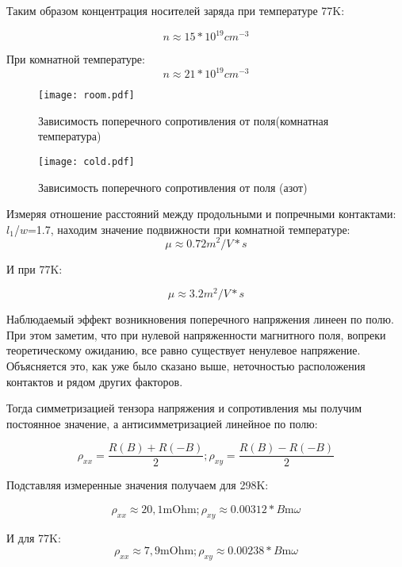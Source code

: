 Таким образом концентрация носителей заряда при температуре 77K:

$$n\approx15*10^{19}cm^{-3}$$ 

При комнатной температуре:
$$n\approx21*10^{19}cm^{-3}$$ 
\begin{figure}[H]
	\centering
	\texttt{[image: room.pdf]}
	\caption{Зависимость поперечного сопротивления от поля(комнатная температура)}
	\label{fig:room}
\end{figure}

\begin{figure}[H]
	\centering
	\texttt{[image: cold.pdf]}
	\caption{Зависимость поперечного  сопротивления от поля (азот)}
	\label{fig:cold}
\end{figure}

Измеряя отношение расстояний между продольными и попречными контактами: $l_1$/$w$=1.7, находим значение подвижности при комнатной температуре:
$$\mu\approx 0.72   m^2/V*s$$

И при 77K:

$$\mu\approx 3.2   m^2/V*s$$

Наблюдаемый эффект возникновения поперечного напряжения линеен по полю. При этом заметим, что при нулевой напряженности магнитного поля, вопреки теоретическому ожиданию, все равно существует ненулевое напряжение. Объясняется это, как уже было сказано выше, неточностью расположения контактов и рядом других факторов. 

Тогда симметризацией тензора напряжения и сопротивления мы получим постоянное значение, а антисимметризацией линейное по полю:

$$ \rho_{xx}=\frac{R(B)+R(-B)}{2};\rho_{xy}=\frac{R(B)-R(-B)}{2}$$

Подставляя измеренные значения получаем для 298K:

$$\rho_{xx}\approx20,1 \text{mOhm};\rho_{xy}\approx0.00312*B \text{m$\omega$}$$

И для 77K:
$$\rho_{xx}\approx7,9 \text{mOhm};\rho_{xy}\approx0.00238*B \text{m$\omega$}$$
